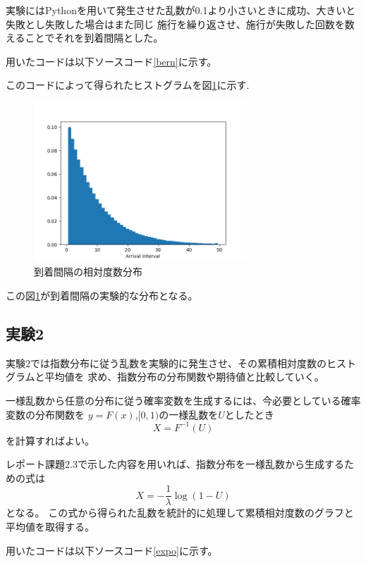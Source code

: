 \documentclass[a4paper,11pt,dvipdfmx]{jsarticle}
\begin{document}
実験にはPythonを用いて発生させた乱数が0.1より小さいときに成功、大きいと失敗とし失敗した場合はまた同じ
施行を繰り返させ、施行が失敗した回数を数えることでそれを到着間隔とした。

用いたコードは以下ソースコード\ref{bern}に示す。


このコードによって得られたヒストグラムを図\ref{berhist}に示す.
\begin{figure}[h]
\centering
\includegraphics[width=80mm]{Bernoulli.png}
\caption{到着間隔の相対度数分布}
\label{berhist}
\end{figure}

この図\ref{berhist}が到着間隔の実験的な分布となる。

\subsection{実験2}
実験2では指数分布に従う乱数を実験的に発生させ、その累積相対度数のヒストグラムと平均値を
求め、指数分布の分布関数や期待値と比較していく。

一様乱数から任意の分布に従う確率変数を生成するには、今必要としている確率変数の分布関数を
$y=F(x)$,$[0,1)$の一様乱数を$U$としたとき
\begin{equation}
    X=F^{-1}(U)
\end{equation}
を計算すればよい。

レポート課題2.3で示した内容を用いれば、指数分布を一様乱数から生成するための式は
\begin{equation}
    X = -\frac{1}{\lambda}\log(1-U)
\end{equation}
となる。
この式から得られた乱数を統計的に処理して累積相対度数のグラフと平均値を取得する。

用いたコードは以下ソースコード\ref{expo}に示す。

\end{document}

